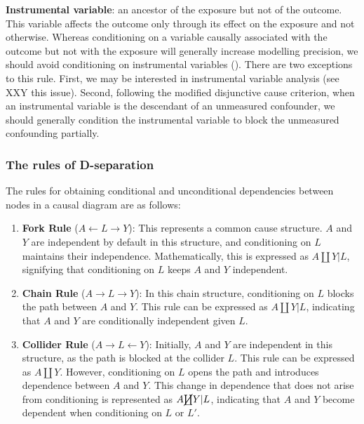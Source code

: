 \documentclass[
  singlecolumn,
  9pt]{article}
\begin{document}
\textbf{Instrumental variable}: an ancestor of the exposure but not of
the outcome. This variable affects the outcome only through its effect
on the exposure and not otherwise. Whereas conditioning on a variable
causally associated with the outcome but not with the exposure will
generally increase modelling precision, we should avoid conditioning on
instrumental variables (). There are two exceptions to this rule. First, we may be
interested in instrumental variable analysis (see XXY this issue).
Second, following the modified disjunctive cause criterion, when an
instrumental variable is the descendant of an unmeasured confounder, we
should generally condition the instrumental variable to block the
unmeasured confounding partially.

\subsubsection{The rules of
D-separation}\label{the-rules-of-d-separation}

The rules for obtaining conditional and unconditional dependencies
between nodes in a causal diagram are as follows:

\begin{enumerate}
\def\labelenumi{\arabic{enumi}.}
\item
  \textbf{Fork Rule} (\(A \leftarrow L \rightarrow Y\)): This represents
  a common cause structure. \(A\) and \(Y\) are independent by default
  in this structure, and conditioning on \(L\) maintains their
  independence. Mathematically, this is expressed as \(A \coprod Y|L\),
  signifying that conditioning on \(L\) keeps \(A\) and \(Y\)
  independent.
\item
  \textbf{Chain Rule} (\(A \rightarrow L \rightarrow Y\)): In this chain
  structure, conditioning on \(L\) blocks the path between \(A\) and
  \(Y\). This rule can be expressed as \(A \coprod Y | L\), indicating
  that \(A\) and \(Y\) are conditionally independent given \(L\).
\item
  \textbf{Collider Rule} (\(A \rightarrow L \leftarrow Y\)): Initially,
  \(A\) and \(Y\) are independent in this structure, as the path is
  blocked at the collider \(L\). This rule can be expressed as
  \(A \coprod Y\). However, conditioning on \(L\) opens the path and
  introduces dependence between \(A\) and \(Y\). This change in
  dependence that does not arise from conditioning is represented as
  \(A \cancel{\coprod} Y | L\), indicating that \(A\) and \(Y\) become
  dependent when conditioning on \(L\) or \(L'\).
\end{enumerate}
\end{document}
